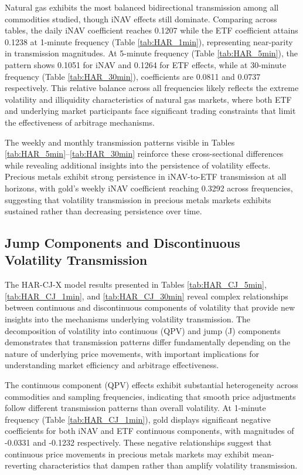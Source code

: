 Natural gas exhibits the most balanced bidirectional transmission among all commodities studied, though iNAV effects still dominate. Comparing across tables, the daily iNAV coefficient reaches 0.1207 while the ETF coefficient attains 0.1238 at 1-minute frequency (Table \ref{tab:HAR_1min}), representing near-parity in transmission magnitudes. At 5-minute frequency (Table \ref{tab:HAR_5min}), the pattern shows 0.1051 for iNAV and 0.1264 for ETF effects, while at 30-minute frequency (Table \ref{tab:HAR_30min}), coefficients are 0.0811 and 0.0737 respectively. This relative balance across all frequencies likely reflects the extreme volatility and illiquidity characteristics of natural gas markets, where both ETF and underlying market participants face significant trading constraints that limit the effectiveness of arbitrage mechanisms.

The weekly and monthly transmission patterns visible in Tables \ref{tab:HAR_5min}--\ref{tab:HAR_30min} reinforce these cross-sectional differences while revealing additional insights into the persistence of volatility effects. Precious metals exhibit strong persistence in iNAV-to-ETF transmission at all horizons, with gold's weekly iNAV coefficient reaching 0.3292 across frequencies, suggesting that volatility transmission in precious metals markets exhibits sustained rather than decreasing persistence over time.

\subsection{Jump Components and Discontinuous Volatility Transmission}

The HAR-CJ-X model results presented in Tables \ref{tab:HAR_CJ_5min}, \ref{tab:HAR_CJ_1min}, and \ref{tab:HAR_CJ_30min} reveal complex relationships between continuous and discontinuous components of volatility that provide new insights into the mechanisms underlying volatility transmission. The decomposition of volatility into continuous (QPV) and jump (J) components demonstrates that transmission patterns differ fundamentally depending on the nature of underlying price movements, with important implications for understanding market efficiency and arbitrage effectiveness.

The continuous component (QPV) effects exhibit substantial heterogeneity across commodities and sampling frequencies, indicating that smooth price adjustments follow different transmission patterns than overall volatility. At 1-minute frequency (Table \ref{tab:HAR_CJ_1min}), gold displays significant negative coefficients for both iNAV and ETF continuous components, with magnitudes of -0.0331 and -0.1232 respectively. These negative relationships suggest that continuous price movements in precious metals markets may exhibit mean-reverting characteristics that dampen rather than amplify volatility transmission.

